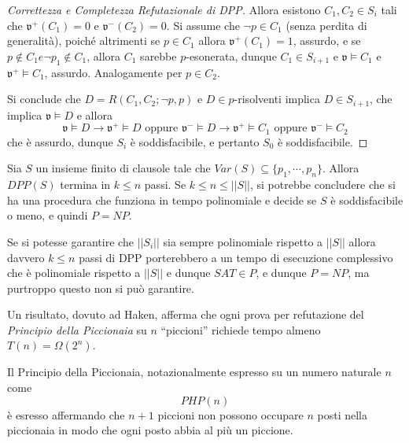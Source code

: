 \begin{proof}[Correttezza e Completezza Refutazionale di DPP]
        Allora esistono $C_1, C_2 \in S_i$ tali che $\mathfrak{v}^+(C_1) = 0$ 
        e $\mathfrak{v}^-(C_2) = 0$. Si assume che
        $\neg p \in C_1$ (senza perdita di generalità), poiché altrimenti se $p \in C_1$ allora 
        $\mathfrak{v}^+(C_1) = 1$, assurdo, e se 
        $p \notin C_1 e \neg p_1 \notin C_1$, allora $C_1$ sarebbe $p$-esonerata, 
        dunque $C_1 \in S_{i+1}$ e $\mathfrak{v} \models C_1$ e $\mathfrak{v}^+ \models C_1$, 
        assurdo. Analogamente per $p \in C_2$. 

        Si conclude che 
        $D = R(C_1, C_2; \neg p, p)$ e $D \in p$-risolventi implica $D \in S_{i+1}$, 
        che implica $\mathfrak{v} \models D$ e allora 
        $$
        \mathfrak{v} \models D \rightarrow \mathfrak{v}^+ \models D \text{ oppure } \mathfrak{v}^- \models D \rightarrow \mathfrak{v}^+ \models C_1 \text{ oppure } \mathfrak{v}^- \models C_2
        $$
        che è assurdo, dunque $S_i$ è soddisfacibile, e pertanto $S_0$ è soddisfacibile.
\end{proof}

\begin{oss}
Sia $S$ un insieme finito di clausole tale che $Var(S) \subseteq \{p_1, \cdots, p_n\}$. 
Allora $DPP(S)$ termina in $k \leq n$ passi. Se $k \leq n \leq ||S||$, 
si potrebbe concludere che si ha una procedura che funziona in tempo 
polinomiale e decide se $S$ è soddisfacibile o meno, e quindi $P = NP$. 
\end{oss}

Se si potesse garantire che $||S_i||$ sia sempre polinomiale rispetto 
a $||S||$ allora davvero $k \leq n$ passi di DPP porterebbero a 
un tempo di esecuzione complessivo che è polinomiale rispetto a $||S||$ 
e dunque $SAT \in P$, e dunque $P = NP$, ma purtroppo questo non si 
può garantire.

Un risultato, dovuto ad Haken, afferma che ogni prova per refutazione del 
\textit{Principio della Piccionaia} su $n$ ``piccioni''
richiede tempo almeno $T(n) = \Omega(2^n)$. 


\begin{defi}
        Il Principio della Piccionaia, notazionalmente espresso su un 
        numero naturale $n$ come 
        $$
        PHP(n)
        $$
        è esresso affermando che $n+1$ piccioni non possono occupare 
        $n$ posti nella piccionaia in modo che ogni posto abbia al più un 
        piccione. 
\end{defi}

